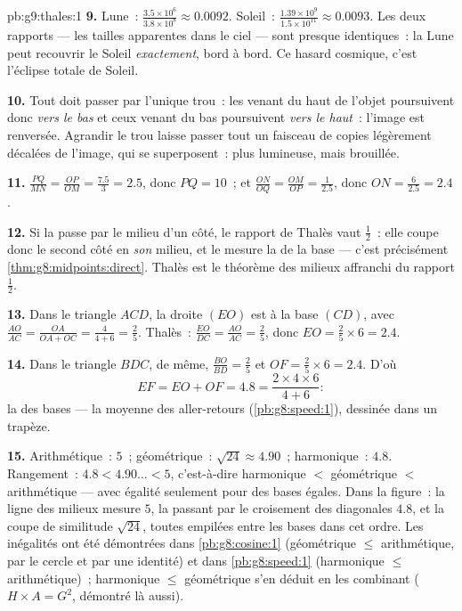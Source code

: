 \begin{solution}{pb:g9:thales:1}
\textbf{9.} Lune~: $\frac{3.5 \times 10^6}{3.8 \times 10^8}
\approx 0.0092$. Soleil~: $\frac{1.39 \times 10^9}{1.5 \times
10^{11}} \approx 0.0093$. Les deux rapports --- les tailles
apparentes dans le ciel --- sont presque identiques~: la Lune peut
recouvrir le Soleil \emph{exactement}, bord à bord. Ce hasard
cosmique, c'est l'éclipse totale de Soleil.

\textbf{10.} Tout  doit passer par l'unique trou~: les 
venant du haut de l'objet poursuivent donc \emph{vers le bas} et
ceux venant du bas poursuivent \emph{vers le haut}~: l'image est
renversée. Agrandir le trou laisse passer tout un faisceau de copies
légèrement décalées de l'image, qui se superposent~: plus lumineuse,
mais brouillée.

\textbf{11.} $\frac{PQ}{MN} = \frac{OP}{OM} = \frac{7.5}{3}
= 2.5$, donc $PQ = 10$~; et $\frac{ON}{OQ} = \frac{OM}{OP} =
\frac{1}{2.5}$, donc $ON = \frac{6}{2.5} = 2.4$.

\textbf{12.} Si la  passe par le milieu d'un côté, le
rapport de Thalès vaut $\frac12$~: elle coupe donc le second côté en
\emph{son} milieu, et le   mesure la  de la
base --- c'est précisément \cref{thm:g8:midpoints:direct}. Thalès
est le théorème des milieux affranchi du rapport $\frac12$.

\textbf{13.} Dans le triangle $ACD$, la droite $(EO)$ est 
à la base $(CD)$, avec $\frac{AO}{AC} = \frac{OA}{OA + OC} =
\frac{4}{4 + 6} = \frac25$. Thalès~:
$\frac{EO}{DC} = \frac{AO}{AC} = \frac25$, donc
$EO = \frac25 \times 6 = 2.4$.

\textbf{14.} Dans le triangle $BDC$, de même,
$\frac{BO}{BD} = \frac25$ et $OF = \frac25 \times 6 = 2.4$. D'où
\[
EF = EO + OF = 4.8
= \frac{2 \times 4 \times 6}{4 + 6} :
\]
la  des bases --- la moyenne des aller-retours
(\cref{pb:g8:speed:1}), dessinée dans un trapèze.

\textbf{15.} Arithmétique~: $5$~; géométrique~:
$\sqrt{24} \approx 4.90$~; harmonique~: $4.8$. Rangement~:
$4.8 < 4.90\ldots < 5$, c'est-à-dire harmonique $<$ géométrique $<$
arithmétique --- avec égalité seulement pour des bases égales. Dans
la figure~: la ligne des milieux mesure $5$, la  passant
par le croisement des diagonales $4.8$, et la coupe de similitude
$\sqrt{24}$, toutes empilées entre les bases dans cet ordre. Les
inégalités ont été démontrées dans \cref{pb:g8:cosine:1}
(géométrique $\leq$ arithmétique, par le cercle et par une identité)
et dans \cref{pb:g8:speed:1} (harmonique $\leq$ arithmétique)~;
harmonique $\leq$ géométrique s'en déduit en les combinant
($H \times A = G^2$, démontré là aussi).
\end{solution}
